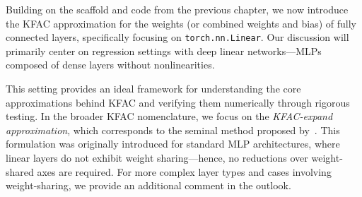 Building on the scaffold and code from the previous chapter, we now introduce the KFAC approximation for the weights (or combined weights and bias) of fully connected layers, specifically focusing on \texttt{torch.nn.Linear}.
Our discussion will primarily center on regression settings with deep linear networks---MLPs composed of dense layers without nonlinearities.

This setting provides an ideal framework for understanding the core approximations behind KFAC and verifying them numerically through rigorous testing.
In the broader KFAC nomenclature, we focus on the \emph{KFAC-expand approximation}, which corresponds to the seminal method proposed by~\citet{martens2015optimizing}.
This formulation was originally introduced for standard MLP architectures, where linear layers do not exhibit weight sharing---hence, no reductions over weight-shared axes are required.
For more complex layer types and cases involving weight-sharing, we provide an additional comment in the outlook.


